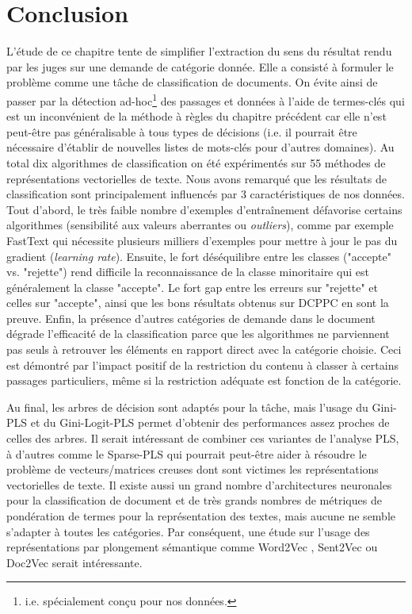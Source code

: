 \section{Conclusion}
\label{sec:sensresultat:conclusion}
L'étude de ce chapitre tente de simplifier l'extraction du sens du résultat rendu par les juges sur une demande de catégorie donnée. Elle a consisté à formuler le problème comme une tâche de classification de documents. On évite ainsi de passer par la détection ad-hoc\footnote{i.e. spécialement conçu pour nos données.} des passages et données à l'aide de termes-clés qui est un inconvénient de la méthode à règles du chapitre précédent car elle n'est peut-être pas généralisable à tous types de décisions (i.e. il pourrait être nécessaire d'établir de nouvelles listes de mots-clés pour d'autres domaines). Au total dix algorithmes de classification on été expérimentés sur 55 méthodes de représentations vectorielles de texte. Nous avons remarqué que les résultats de classification sont principalement influencés par 3 caractéristiques de nos données. Tout d'abord, le très faible nombre d'exemples d'entraînement défavorise certains algorithmes (sensibilité aux valeurs aberrantes ou \textit{outliers}), comme par exemple FastText qui nécessite plusieurs milliers d'exemples pour mettre à jour le pas du gradient (\textit{learning rate}). Ensuite, le fort déséquilibre entre les classes ("accepte" vs. "rejette") rend difficile la reconnaissance de la classe minoritaire qui est généralement la classe "accepte". Le fort gap entre les erreurs sur "rejette" et celles sur "accepte", ainsi que les bons résultats obtenus sur DCPPC en sont la preuve. Enfin, la présence d'autres catégories de demande dans le document dégrade l'efficacité de la classification parce que les algorithmes ne parviennent pas seuls à retrouver les éléments en rapport direct avec la catégorie choisie. Ceci est démontré par l'impact positif de la restriction du contenu à classer à certains passages particuliers, même si la restriction adéquate est fonction de la catégorie.
 
Au final, les arbres de décision sont adaptés pour la tâche, mais l'usage du Gini-PLS et du Gini-Logit-PLS permet d'obtenir des performances assez proches de celles des arbres. %
Il serait intéressant de combiner ces variantes de l'analyse PLS, à d'autres comme le Sparse-PLS qui pourrait peut-être aider à résoudre le problème de vecteurs/matrices creuses dont sont victimes les représentations vectorielles de texte. Il existe aussi un grand nombre d'architectures neuronales pour la classification de document et de très grands nombres de métriques de pondération de termes pour la représentation des textes, mais aucune ne semble s'adapter à toutes les catégories. Par conséquent, une étude sur l'usage des représentations par plongement sémantique comme Word2Vec \citep{mikolov2013word2vec}, Sent2Vec \citep{pagliardini2017sent2vec} ou Doc2Vec \citep{quoc2014doc2vec} serait intéressante.
